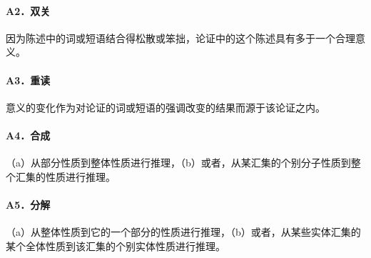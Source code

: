 \paragraph{A2．双关}
因为陈述中的词或短语结合得松散或笨拙，论证中的这个陈述具有多于一个合理意义。

\paragraph{A3．重读}
意义的变化作为对论证的词或短语的强调改变的结果而源于该论证之内。

\paragraph{A4．合成}
（a）从部分性质到整体性质进行推理，（b）或者，从某汇集的个别分子性质到整个汇集的性质进行推理。

\paragraph{A5．分解}
（a）从整体性质到它的一个部分的性质进行推理，（b）或者，从某些实体汇集的某个全体性质到该汇集的个别实体性质进行推理。

\begin{center}
\end{center}

\printbibliography[heading=subbibliography,title={第4章参考文献}]
